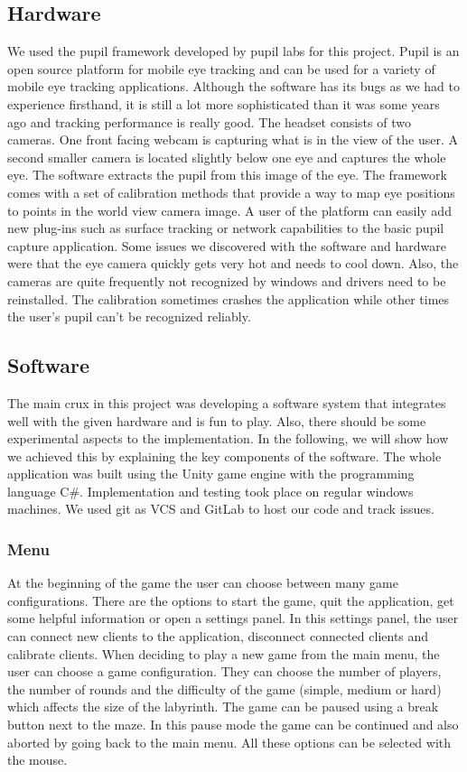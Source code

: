 \documentclass{sigchi}
\begin{document}
\subsection{Hardware}
We used the pupil framework developed by pupil labs \cite{kassner2014pupil} for this project. Pupil is an open source platform for mobile eye tracking and can be used for a variety of mobile eye tracking applications. Although the software has its bugs as we had to experience firsthand, it is still a lot more sophisticated than it was some years ago and tracking performance is really good. The headset consists of two cameras. One front facing webcam is capturing what is in the view of the user. A second smaller camera is located slightly below one eye and captures the whole eye. The software extracts the pupil from this image of the eye. The framework comes with a set of calibration methods that provide a way to map eye positions to points in the world view camera image. A user of the platform can easily add new plug-ins such as surface tracking or network capabilities to the basic pupil capture application. Some issues we discovered with the software and hardware were that the eye camera quickly gets very hot and needs to cool down. Also, the cameras are quite frequently not recognized by windows and drivers need to be reinstalled. The calibration sometimes crashes the application while other times the user's pupil can't be recognized reliably.

\subsection{Software}
The main crux in this project was developing a software system that integrates well with the given hardware and is fun to play. Also, there should be some experimental aspects to the implementation. In the following, we will show how we achieved this by explaining the key components of the software. The whole application was built using the Unity game engine with the programming language C\#. Implementation and testing took place on regular windows machines. We used git as VCS and GitLab to host our code and track issues.

\subsubsection{Menu}
At the beginning of the game the user can choose between many game configurations. There are the options to start the game, quit the application, get some helpful information or open a settings panel. In this settings panel, the user can connect new clients to the application, disconnect connected clients and calibrate clients. When deciding to play a new game from the main menu, the user can choose a game configuration. They can choose the number of players, the number of rounds and the difficulty of the game (simple, medium or hard) which affects the size of the labyrinth. The game can be paused using a break button next to the maze. In this pause mode the game can be continued and also aborted by going back to the main menu. All these options can be selected with the mouse.
\end{document}
